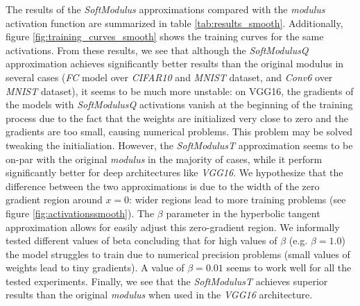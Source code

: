 The results of the \textit{SoftModulus} approximations compared with the \textit{modulus} activation function are summarized in table \ref{tab:results_smooth}. Additionally, figure \ref{fig:training_curves_smooth} shows the training curves for the same activations. From these results, we see that although the \textit{SoftModulusQ} approximation achieves significantly better results than the original modulus in several cases (\textit{FC} model over \textit{CIFAR10} and \textit{MNIST} dataset, and \textit{Conv6} over \textit{MNIST} dataset), it seems to be much more unstable: on VGG16, the gradients of the models with \textit{SoftModulusQ} activations vanish at the beginning of the training process due to the fact that the weights are initialized very close to zero and the gradients are too small, causing numerical problems. This problem may be solved tweaking the initialiation. However, the \textit{SoftModulusT} approximation seems to be on-par with the original \textit{modulus} in the majority of cases, while it perform significantly better for deep architectures like \textit{VGG16}. We hypothesize that the difference between the two approximations is due to the width of the zero gradient region around $x=0$: wider regions lead to more training problems (see figure \ref{fig:activationssmooth}). The $\beta$ parameter in the hyperbolic tangent approximation allows for easily adjust this zero-gradient region. We informally tested different values of beta concluding that for high values of $\beta$ (e.g. $\beta=1.0$) the model struggles to train due to numerical precision problems (small values of weights lead to tiny gradients). A value of $\beta=0.01$ seems to work well for all the tested experiments. Finally, we see that the \textit{SoftModulusT} achieves superior results than the original \textit{modulus} when used in the \textit{VGG16} architecture.


